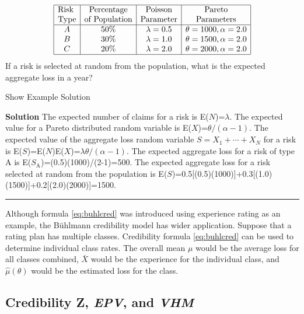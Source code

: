 \documentclass[]{book}
\theoremstyle{definition}
\theoremstyle{definition}
\theoremstyle{definition}
\theoremstyle{remark}
\begin{document}
\[\begin{matrix}
\begin{array}{|c|c|c|c|}
\hline
\text{Risk } & \text{Percentage} & \text{Poisson} & \text{Pareto} \\
\text{Type} & \text{of Population} & \text{Parameter} & \text{Parameters} \\
\hline
A & 50\% & \lambda=0.5 & \theta=1000, \alpha=2.0 \\
B & 30\% & \lambda=1.0 & \theta=1500, \alpha=2.0 \\  
C & 20\% & \lambda=2.0 & \theta=2000, \alpha=2.0 \\              
\hline
\end{array}
\end{matrix}\] If a risk is selected at random from the population, what
is the expected aggregate loss in a year?

Show Example Solution

\hypertarget{toggleExampleCred.3.2}{}
\textbf{Solution} The expected number of claims for a risk is
E(\(N\))=\(\lambda\). The expected value for a Pareto distributed random
variable is E(\(X\))=\(\theta/(\alpha-1)\). The expected value of the
aggregate loss random variable \(S=X_1+\cdots+X_N\) for a risk is
E(\(S\))=E(\(N\))E(\(X\))=\(\lambda\theta/(\alpha-1)\). The expected
aggregate loss for a risk of type A is
E(\(S_{\textrm{A}}\))=(0.5)(1000)/(2-1)=500. The expected aggregate loss
for a risk selected at random from the population is
E(\(S\))=0.5{[}(0.5)(1000){]}+0.3{[}(1.0)(1500){]}+0.2{[}(2.0)(2000){]}=1500.

\begin{center}\rule{0.5\linewidth}{\linethickness}\end{center}

Although formula \eqref{eq:buhlcred} was introduced using experience
rating as an example, the Bühlmann credibility model has wider
application. Suppose that a rating plan has multiple classes.
Credibility formula \eqref{eq:buhlcred} can be used to determine
individual class rates. The overall mean \(\mu\) would be the average
loss for all classes combined, \(\bar{X}\) would be the experience for
the individual class, and \(\hat{\mu}(\theta)\) would be the estimated
loss for the class.

\subsection{\texorpdfstring{Credibility Z, \emph{EPV}, and
\emph{VHM}}{Credibility Z, EPV, and VHM}}\label{S:EPV-VHM-Z}
\end{document}
